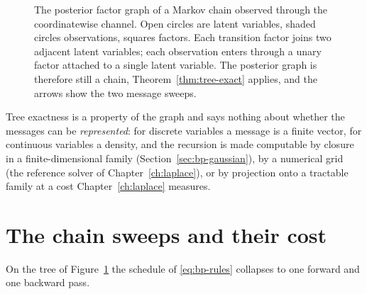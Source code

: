 \begin{figure}[t]\centering
{}
\caption[Posterior factor graph of a noised Markov chain]{The posterior factor
graph of a Markov chain observed through the coordinatewise channel. Open
circles are latent variables, shaded circles observations, squares factors.
Each transition factor joins two adjacent latent variables; each observation
enters through a unary factor attached to a single latent variable. The
posterior graph is therefore still a chain, Theorem~\ref{thm:tree-exact}
applies, and the arrows show the two message sweeps.}
\label{fig:posterior-factor-graph}
\end{figure}

Tree exactness is a property of the graph and says nothing about whether the
messages can be \emph{represented}: for discrete variables a message is a
finite vector, for continuous variables a density, and the recursion is made
computable by closure in a finite-dimensional family
(Section~\ref{sec:bp-gaussian}), by a numerical grid (the reference solver
of Chapter~\ref{ch:laplace}), or by projection onto a tractable family at a
cost Chapter~\ref{ch:laplace} measures.

\section{The chain sweeps and their cost}
\label{sec:bp-chain}\label{sec:bp-sweep}

On the tree of Figure~\ref{fig:posterior-factor-graph} the schedule of
\eqref{eq:bp-rules} collapses to one forward and one backward pass.

